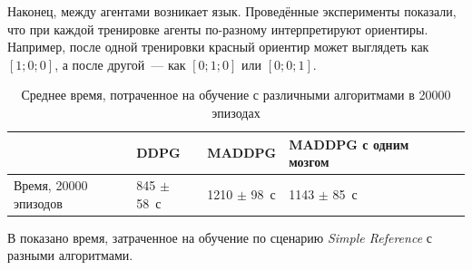 Наконец, между агентами возникает язык. Проведённые эксперименты показали, что при каждой тренировке агенты по-разному интерпретируют ориентиры. Например, после одной тренировки красный ориентир может выглядеть как ${[1; 0; 0]}$, а после другой~--- как ${[0; 1; 0]}$ или ${[0; 0; 1]}$.

\begin{table}[t!]
    \centering\small
    \caption{Среднее время, потраченное на обучение с различными алгоритмами в 20000 эпизодах}
    \label{tab-sr-time}
    \begin{tabular}{|l|l|l|l|l|l|}
        \hline
        & DDPG           & MADDPG          & MADDPG с одним мозгом \\
        \hline
        Время, 20000 эпизодов & 845 $\pm$ 58~с & 1210 $\pm$ 98~с & 1143 $\pm$ 85~с       \\ \hline
    \end{tabular}
    \normalsize%
\end{table}

В  показано время, затраченное на обучение по сценарию \textit{Simple Reference} с разными алгоритмами.
